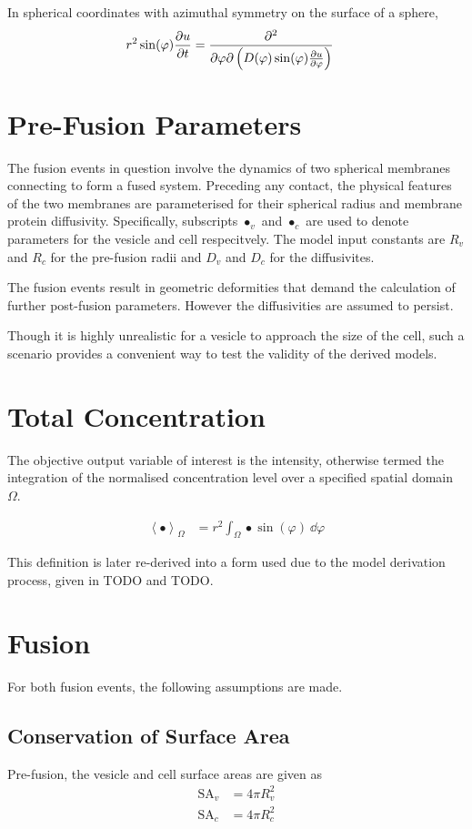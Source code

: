 \documentclass{report}
\newcommand\Par[1]{{ \left({#1}\right) }}
\newcommand\Angle[1]{{ \left\langle{#1}\right\rangle }}
\newcommand\SA{{ \text{SA} }}
\begin{document}
In spherical coordinates with azimuthal symmetry on the surface of a sphere,
\begin{align*}
	r^2 \sin(\varphi) \pdv{u}{t} &= \pdv{}{\varphi}\Par{D(\varphi) \sin(\varphi) \pdv{u}{\varphi}}
\end{align*}

\section{Pre-Fusion Parameters}
The fusion events in question involve the dynamics of two spherical membranes connecting to form a fused system. Preceding any contact, the physical features of the two membranes are parameterised for their spherical radius and membrane protein diffusivity. Specifically, subscripts $\bullet_v$ and $\bullet_c$ are used to denote parameters for the vesicle and cell respecitvely. The model input constants are $R_v$ and $R_c$ for the pre-fusion radii and $D_v$ and $D_c$ for the diffusivites.

The fusion events result in geometric deformities that demand the calculation of further post-fusion parameters. However the diffusivities are assumed to persist.

Though it is highly unrealistic for a vesicle to approach the size of the cell, such a scenario provides a convenient way to test the validity of the derived models.

\section{Total Concentration}
The objective output variable of interest is the intensity, otherwise termed the integration of the normalised concentration level over a specified spatial domain $\Omega$.

\begin{align*}
	\Angle{\bullet}_\Omega &= r^2 \int_\Omega \bullet \sin(\varphi)\ \dd\varphi
\end{align*}

This definition is later re-derived into a form used due to the model derivation process, given in TODO and TODO.

\section{Fusion}

For both fusion events, the following assumptions are made.

\subsection{Conservation of Surface Area}
Pre-fusion, the vesicle and cell surface areas are given as
\begin{align*}
	\SA_v &= 4\pi R_v^2 \\
	\SA_c &= 4\pi R_c^2
\end{align*}
\end{document}
